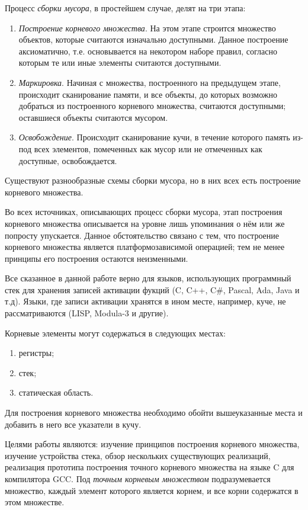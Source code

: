 Процесс \emph{сборки мусора}, в простейшем случае, делят на три этапа:
\begin{enumerate}
\item \emph{Построение корневого множества}. На этом этапе строится множество объектов, которые считаются изначально доступными. Данное построение аксиоматично, т.е. основывается на некотором наборе правил, согласно которым те или иные элементы считаются доступными.
\item \emph{Маркировка}. Начиная с множества, построенного на предыдущем этапе, происходит сканирование памяти, и все объекты, до которых возможно добраться из построенного корневого множества, считаются доступными; оставшиеся объекты считаются мусором.
\item \emph{Освобождение}. Происходит сканирование кучи, в течение которого память из-под всех элементов, помеченных как мусор или не отмеченных как доступные, освобождается.
\end{enumerate}

Существуют разнообразные схемы сборки мусора, но в них всех есть построение корневого множества.

Во всех источниках, описывающих процесс сборки мусора, этап построения корневого множества описывается на уровне лишь упоминания о нём или же попросту упускается. Данное обстоятельство связано с тем, что построение корневого множества является платформозависимой операцией; тем не менее принципы его построения остаются неизменными.

Все сказанное в данной работе верно для языков, использующих программный стек для хранения записей активации фукций (C, C++, C\#, Pascal, Ada, Java и т.д). Языки, где записи активации хранятся в ином месте, например, куче, не рассматриваются (LISP, Modula-3 и другие).

Корневые элементы могут содержаться в следующих местах:
\begin{enumerate}
\item регистры;
\item стек;
\item статическая область.
\end{enumerate}

Для построения корневого множества необходимо обойти вышеуказанные места и добавить в него все указатели в кучу.

Целями работы являются: изучение принципов построения корневого множества, изучение устройства стека, обзор нескольких существующих реализаций, реализация прототипа построения точного корневого множества на языке C для компилятора GCC. Под \emph{точным корневым множеством} подразумевается множество, каждый элемент которого является корнем, и все корни содержатся в этом множестве.

